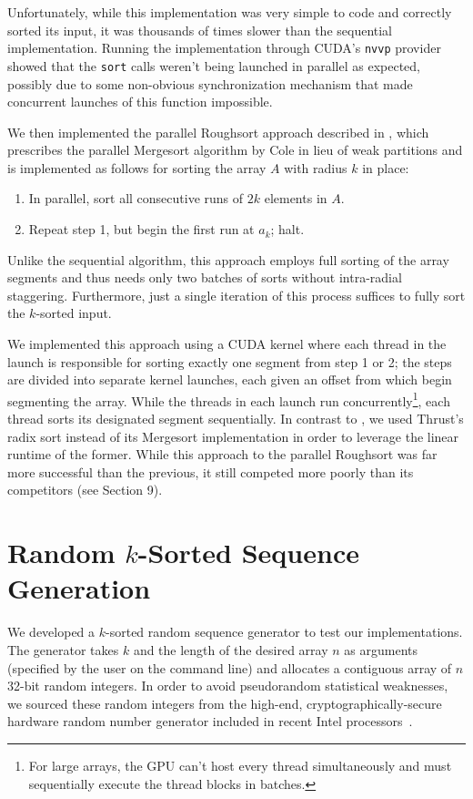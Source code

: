 \documentclass[letterpaper, 12pt]{article}
\let\supercite\cite
\renewcommand{\cite}[1]{\textnormal{~\supercite{#1}}}
\begin{document}
Unfortunately, while this implementation was very simple to code and correctly sorted its input, it was thousands of times
  slower than the sequential implementation.
Running the implementation through CUDA's \texttt{nvvp} provider showed that the \texttt{sort} calls weren't being launched in
  parallel as expected, possibly due to some non-obvious synchronization mechanism that made concurrent launches of this
  function impossible.

We then implemented the parallel Roughsort approach described in \supercite{altman90}, which prescribes the parallel Mergesort
  algorithm by Cole in lieu of weak partitions and is implemented as follows for sorting the array $A$ with radius $k$ in place:
\begin{enumerate}\setlength{\itemsep}{0pt}\setlength{\parskip}{0pt}
\item In parallel, sort all consecutive runs of $2k$ elements in $A$.
\item Repeat step 1, but begin the first run at $a_k$; halt.
\end{enumerate}

Unlike the sequential algorithm, this approach employs full sorting of the array segments and thus needs only two batches of
  sorts without intra-radial staggering.
Furthermore, just a single iteration of this process suffices to fully sort the $k$-sorted input.

We implemented this approach using a CUDA kernel where each thread in the launch is responsible for sorting exactly one segment
  from step 1 or 2; the steps are divided into separate kernel launches, each given an offset from which begin segmenting the
  array.
While the threads in each launch run concurrently\footnote{For large arrays, the GPU can't host every thread simultaneously and
  must sequentially execute the thread blocks in batches.}, each thread sorts its designated segment sequentially.
In contrast to \supercite{altman90}, we used Thrust's radix sort instead of its Mergesort implementation in order to leverage
  the linear runtime of the former.
While this approach to the parallel Roughsort was far more successful than the previous, it still competed more poorly than
  its competitors (see Section 9).

\section{Random $k$-Sorted Sequence Generation}
We developed a $k$-sorted random sequence generator to test our implementations.
The generator takes $k$ and the length of the desired array $n$ as arguments (specified by the user on the command line) and
  allocates a contiguous array of $n$ 32-bit random integers.
In order to avoid pseudorandom statistical weaknesses, we sourced these random integers from the high-end,
   cryptographically-secure hardware random number generator included in recent Intel processors\cite{intel12}.
\end{document}
